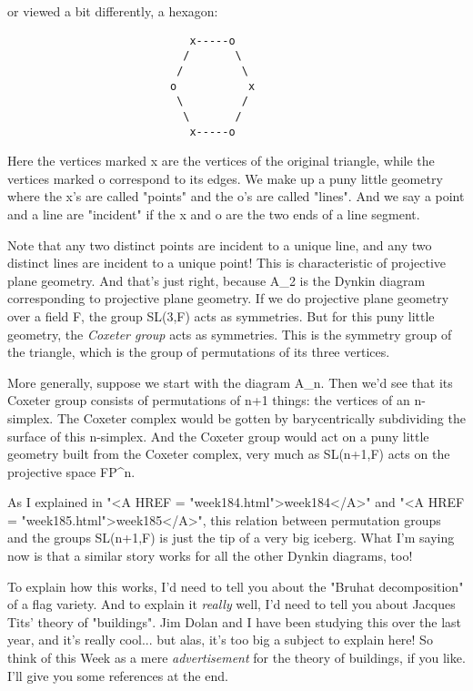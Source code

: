 or viewed a bit differently, a hexagon:


\begin{verbatim}
                            x-----o
                           /       \
                          /         \
                         o           x
                          \         /
                           \       /
                            x-----o
\end{verbatim}
    
Here the vertices marked x are the vertices of the original triangle,
while the vertices marked o correspond to its edges.  We make up a puny
little geometry where the x's are called "points" and the o's
are called "lines".  And we say a point and a line are
"incident" if the x and o are the two ends of a line segment.

Note that any two distinct points are incident to a unique line, and 
any two distinct lines are incident to a unique point!  This is
characteristic of projective plane geometry.  And that's just right,
because A_{2} is the Dynkin diagram corresponding to projective plane
geometry.  If we do projective plane geometry over a field F, the group
SL(3,F) acts as symmetries.  But for this puny little geometry, the
\emph{Coxeter group} acts as symmetries.  This is the symmetry group of the
triangle, which is the group of permutations of its three vertices.  
                         
More generally, suppose we start with the diagram A_{n}.  Then
we'd see that its Coxeter group consists of permutations of n+1 things:
the vertices of an n-simplex.  The Coxeter complex would be gotten by
barycentrically subdividing the surface of this n-simplex.  And the
Coxeter group would act on a puny little geometry built from the Coxeter
complex, very much as SL(n+1,F) acts on the projective space
FP^{n}.

As I explained in "<A HREF = "week184.html">week184</A>" and "<A HREF = "week185.html">week185</A>", this relation between 
permutation groups and the groups SL(n+1,F) is just the tip of a 
very big iceberg.  What I'm saying now is that a similar story works 
for all the other Dynkin diagrams, too!  

To explain how this works, I'd need to tell you about the "Bruhat
decomposition" of a flag variety.  And to explain it \emph{really} well, 
I'd need to tell you about Jacques Tits' theory of "buildings".  Jim 
Dolan and I have been studying this over the last year, and it's really 
cool... but alas, it's too big a subject to explain here!  So think of 
this Week as a mere \emph{advertisement} for the theory of buildings, if you 
like.  I'll give you some references at the end.

